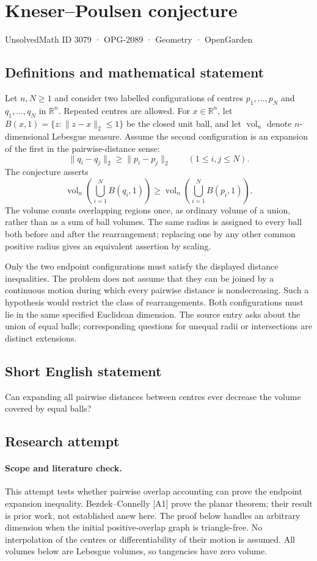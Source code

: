 \documentclass[11pt,a4paper]{article}
\begin{document}
\section*{Kneser–Poulsen conjecture}\label{3079}
{\small UnsolvedMath ID 3079 · OPG-2089 · Geometry · OpenGarden}
\subsection{Definitions and mathematical statement}
Let $n,N\ge1$ and consider two labelled configurations of centres
$p_1,\ldots,p_N$ and $q_1,\ldots,q_N$ in $\mathbb R^n$.
Repeated centres are allowed. For $x\in\mathbb R^n$, let
$B(x,1)=\{z:\|z-x\|_2\le1\}$ be the closed unit ball, and let
$\operatorname{vol}_n$ denote $n$-dimensional Lebesgue measure.
Assume the second configuration is an expansion of the first in the
pairwise-distance sense:
\[
 \|q_i-q_j\|_2\ge\|p_i-p_j\|_2
                    \qquad(1\le i,j\le N).
\]
The conjecture asserts
\[
 \operatorname{vol}_n\!\left(\bigcup_{i=1}^N B(q_i,1)\right)
 \ge
 \operatorname{vol}_n\!\left(\bigcup_{i=1}^N B(p_i,1)\right).
\]
The volume counts overlapping regions once, as ordinary volume of a
union, rather than as a sum of ball volumes. The same radius is assigned
to every ball both before and after the rearrangement; replacing one by
any other common positive radius gives an equivalent assertion by scaling.

Only the two endpoint configurations must satisfy the displayed distance
inequalities. The problem does not assume that they can be joined by a
continuous motion during which every pairwise distance is nondecreasing.
Such a hypothesis would restrict the class of rearrangements. Both
configurations must lie in the same specified Euclidean dimension.
The source entry asks about the union of equal balls; corresponding
questions for unequal radii or intersections are distinct extensions.
\subsection{Short English statement}
Can expanding all pairwise distances between centres ever decrease the volume covered by equal balls?
\subsection{Research attempt}
\paragraph{Scope and literature check.}
This attempt tests whether pairwise overlap accounting can prove the endpoint
expansion inequality. Bezdek--Connelly [A1] prove the planar theorem; their
result is prior work, not established anew here. The proof below handles an
arbitrary dimension when the initial positive-overlap graph is triangle-free.
No interpolation of the centres or differentiability of their motion is assumed.
All volumes below are Lebesgue volumes, so tangencies have zero volume.
\end{document}
